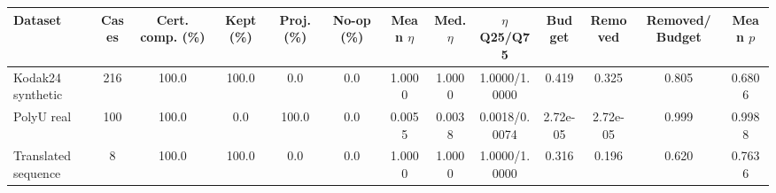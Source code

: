 \begin{tabular}{lcccccccccccc}
\toprule
Dataset & Cases & Cert. comp. (\%) & Kept (\%) & Proj. (\%) & No-op (\%) & Mean $\eta$ & Med. $\eta$ & $\eta$ Q25/Q75 & Budget & Removed & Removed/Budget & Mean $p$ \\
\midrule
Kodak24 synthetic & 216 & 100.0 & 100.0 & 0.0 & 0.0 & 1.0000 & 1.0000 & 1.0000/1.0000 & 0.419 & 0.325 & 0.805 & 0.6806 \\
PolyU real & 100 & 100.0 & 0.0 & 100.0 & 0.0 & 0.0055 & 0.0038 & 0.0018/0.0074 & 2.72e-05 & 2.72e-05 & 0.999 & 0.9988 \\
Translated sequence & 8 & 100.0 & 100.0 & 0.0 & 0.0 & 1.0000 & 1.0000 & 1.0000/1.0000 & 0.316 & 0.196 & 0.620 & 0.7636 \\
\bottomrule
\end{tabular}
